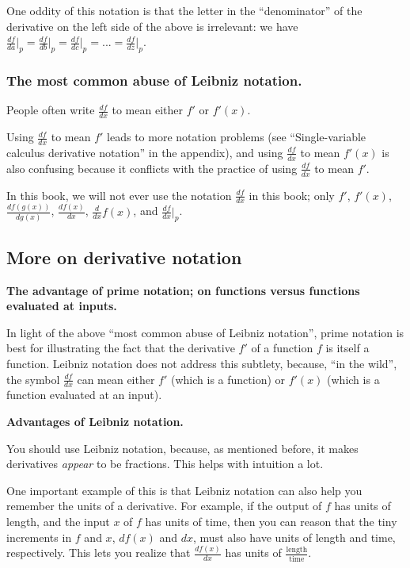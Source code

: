 One oddity of this notation is that the letter in the ``denominator'' of the derivative on the left side of the above is irrelevant: we have $\frac{df}{da}\Big|_p = \frac{df}{db}\Big|_p = \frac{df}{dc}\Big|_p = ... = \frac{df}{dz}\Big|_p$.

\subsubsection*{The most common abuse of Leibniz notation.}

People often write $\frac{df}{dx}$ to mean either $f'$ or $f'(x)$. 

Using $\frac{df}{dx}$ to mean $f'$ leads to more notation problems (see ``Single-variable calculus derivative notation'' in the appendix), and using $\frac{df}{dx}$ to mean $f'(x)$ is also confusing because it conflicts with the practice of using $\frac{df}{dx}$ to mean $f'$.

In this book, we will not ever use the notation $\frac{df}{dx}$ in this book; only $f'$, $f'(x)$, $\frac{df(g(x))}{dg(x)}$, $\frac{df(x)}{dx}$, $\frac{d}{dx}f(x)$, and $\frac{df}{dx}\Big|_p$.

\subsection*{More on derivative notation}

\indent \textbf{The advantage of prime notation; on functions versus functions evaluated at inputs.} 
         
In light of the above ``most common abuse of Leibniz notation'', prime notation is best for illustrating the fact that the derivative $f'$ of a function $f$ is itself a function. Leibniz notation does not address this subtlety, because, ``in the wild'', the symbol $\frac{df}{dx}$ can mean either $f'$ (which is a function) or $f'(x)$ (which is a function evaluated at an input).

\vspace{.5cm}

\textbf{Advantages of Leibniz notation.} 
         
You should use Leibniz notation, because, as mentioned before, it makes derivatives \textit{appear} to be fractions. This helps with intuition a lot.
         
One important example of this is that Leibniz notation can also help you remember the units of a derivative. For example, if the output of $f$ has units of length, and the input $x$ of $f$ has units of time, then you can reason that the tiny increments in $f$ and $x$, $df(x)$ and $dx$, must also have units of length and time, respectively. This lets you realize that $\frac{df(x)}{dx}$ has units of $\frac{\text{length}}{\text{time}}$.
         

